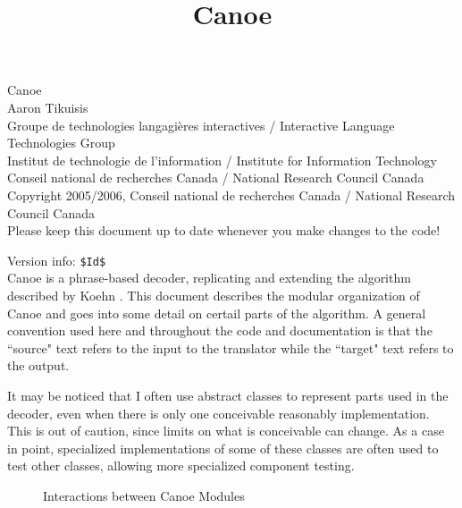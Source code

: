 \documentclass[12pt]{amsart} \usepackage{epsfig} \usepackage{rotating}
\begin{document}
\title{Canoe} \maketitle

{\tiny
\noindent
Canoe\\ Aaron Tikuisis\\ Groupe de technologies langagi{\`e}res interactives /
Interactive Language Technologies Group\\ Institut de technologie de
l'information / Institute for Information Technology\\ Conseil national de
recherches Canada / National Research Council Canada\\ Copyright 2005/2006,
Conseil national de recherches Canada / National Research Council Canada }
\\

\noindent
Please keep this document up to date whenever you make changes to the code!

{\tiny
\noindent
Version info: \verb+$Id$+
}
\\

Canoe is a phrase-based decoder, replicating and extending the
algorithm described by Koehn \cite{koehn03}.  This document
describes the modular organization of Canoe and goes into some detail on
certail parts of the algorithm.  A general convention used here and throughout
the code and documentation is that the ``source" text refers to the input to
the translator while the ``target" text refers to the output.

It may be noticed that I often use abstract classes to represent parts used in
the decoder, even when there is only one conceivable reasonably implementation.
This is out of caution, since limits on what is conceivable can change.  As a
case in point, specialized implementations of some of these classes are often
used to test other classes, allowing more specialized component testing.

\begin{sidewaysfigure}
\centerline{}
\caption{Interactions between Canoe Modules\label{fig:uml}}
\end{sidewaysfigure}
\end{document}
